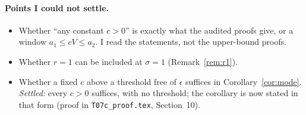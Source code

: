 \documentclass[11pt]{article}
\theoremstyle{definition}
\theoremstyle{remark}
\begin{document}
\paragraph{Points I could not settle.}
\begin{itemize}[itemsep=2pt,topsep=2pt]
\item Whether ``any constant $c>0$'' is exactly what the audited proofs give, or a window $a_1\le cV\le a_2$. I read the statements, not the upper-bound proofs.
\item Whether $r=1$ can be included at $\sigma=1$ (Remark~\ref{rem:r1}).
\item Whether a fixed $c$ above a threshold free of $\epsilon$ suffices in Corollary~\ref{cor:mode}. \emph{Settled:} every $c>0$ suffices, with no threshold; the corollary is now stated in that form (proof in \texttt{T07c\_proof.tex}, Section~10).
\end{itemize}
\end{document}
